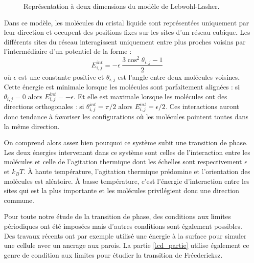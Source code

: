 \documentclass[11pt,a4paper]{article}
\numberwithin{equation}{section}
\begin{document}
\begin{figure}[h]
    \center
    
    \caption{Représentation à deux dimensions du modèle de Lebwohl-Lasher.}
    \label{lebwohl}
\end{figure}


Dans ce modèle, les molécules du cristal liquide sont représentées uniquement par leur direction et occupent des positions fixes sur les sites d'un réseau cubique.
Les différents sites du réseau interagissent uniquement entre plus proches voisins par l'intermédiaire d'un potentiel de la forme :
\begin{equation}
E_{i,j}^{int} = - \epsilon\ \frac{3\cos^2\theta_{i,j}-1}{2}
\label{interact}
\end{equation}
où $\epsilon$ est une constante positive et $\theta_{i,j}$ est l'angle entre deux molécules voisines. 
Cette énergie est minimale lorsque les molécules sont parfaitement alignées : si $\theta_{i,j} = 0$ alors $E_{i,j}^{int} = - \epsilon$. Et elle est maximale lorsque les molécules ont des directions orthogonales : si $\theta_{i,j}^{int} = \pi/2$ alors $E_{i,j}^{int} = \epsilon/2$.
Ces interactions auront donc tendance à favoriser les configurations où les molécules pointent toutes dans la même direction.\medskip

On comprend alors assez bien pourquoi ce système subit une transition de phase. Les deux énergies intervenant dans ce système sont celles de l'interaction entre les molécules et celle de l'agitation thermique dont les échelles sont respectivement $\epsilon$ et $k_B T$.
À haute température, l'agitation thermique prédomine et l'orientation des molécules est aléatoire. À basse température, c'est l'énergie d'interaction entre les sites qui est la plus importante et les molécules privilégient donc une direction commune.\medskip

Pour toute notre étude de la transition de phase, des conditions aux limites périodiques ont été imposées mais d'autres conditions sont également possibles. Des travaux récents \cite{confined} ont par exemple utilisé une énergie à la surface  pour simuler une cellule avec un ancrage aux parois. La partie \ref{lcd_partie} utilise également ce genre de condition aux limites pour étudier la transition de Fréedericksz.

\end{document}

